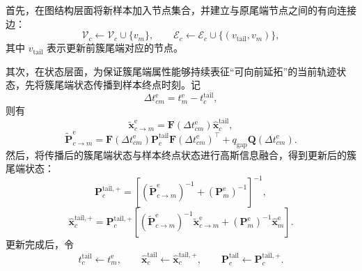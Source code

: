 \documentclass{xdupgthesis}
\begin{document}
首先，在图结构层面将新样本加入节点集合，并建立与原尾端节点之间的有向连接边：
\begin{equation}
	\mathcal{V}_c \leftarrow \mathcal{V}_c \cup \{v_m\}, \qquad
	\mathcal{E}_c \leftarrow \mathcal{E}_c \cup \{(v_{\mathrm{tail}},v_m)\},
\end{equation}
其中 $v_{\mathrm{tail}}$ 表示更新前簇尾端对应的节点。

其次，在状态层面，为保证簇尾端属性能够持续表征“可向前延拓”的当前轨迹状态，先将簇尾端状态传播到样本终点时刻。记
\begin{equation}
	\Delta t_{cm}^{\mathrm{e}}=t_m^{\mathrm{e}}-t_c^{\mathrm{tail}},
\end{equation}
则有
\begin{equation}
	\tilde{\mathbf{x}}_{c\rightarrow m}^{\mathrm{e}}
	=
	\mathbf{F}(\Delta t_{cm}^{\mathrm{e}})\hat{\mathbf{x}}_c^{\mathrm{tail}},
\end{equation}
\begin{equation}
	\tilde{\mathbf{P}}_{c\rightarrow m}^{\mathrm{e}}
	=
	\mathbf{F}(\Delta t_{cm}^{\mathrm{e}})\mathbf{P}_c^{\mathrm{tail}}\mathbf{F}(\Delta t_{cm}^{\mathrm{e}})^{\top}
	+
	q_{\mathrm{gap}}\mathbf{Q}(\Delta t_{cm}^{\mathrm{e}}).
\end{equation}
然后，将传播后的簇尾端状态与样本终点状态进行高斯信息融合，得到更新后的簇尾端状态：
\begin{equation}
	\mathbf{P}_c^{\mathrm{tail},+}
	=
	\left[
	\left(\tilde{\mathbf{P}}_{c\rightarrow m}^{\mathrm{e}}\right)^{-1}
	+
	\left(\mathbf{P}_m^{\mathrm{e}}\right)^{-1}
	\right]^{-1},
\end{equation}
\begin{equation}
	\hat{\mathbf{x}}_c^{\mathrm{tail},+}
	=
	\mathbf{P}_c^{\mathrm{tail},+}
	\left[
	\left(\tilde{\mathbf{P}}_{c\rightarrow m}^{\mathrm{e}}\right)^{-1}
	\tilde{\mathbf{x}}_{c\rightarrow m}^{\mathrm{e}}
	+
	\left(\mathbf{P}_m^{\mathrm{e}}\right)^{-1}
	\hat{\mathbf{x}}_m^{\mathrm{e}}
	\right].
\end{equation}
更新完成后，令
\begin{equation}
	t_c^{\mathrm{tail}} \leftarrow t_m^{\mathrm{e}}, \qquad
	\hat{\mathbf{x}}_c^{\mathrm{tail}} \leftarrow \hat{\mathbf{x}}_c^{\mathrm{tail},+}, \qquad
	\mathbf{P}_c^{\mathrm{tail}} \leftarrow \mathbf{P}_c^{\mathrm{tail},+}.
\end{equation}
\end{document}
